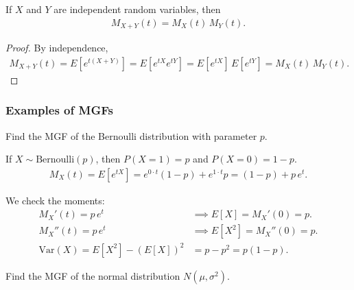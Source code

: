 \begin{teorema}
If $X$ and $Y$ are independent random variables, then
\begin{align}
 \label{eq:2.8.13}
 M_{X+Y}(t) = M_X(t)\,M_Y(t).
\end{align}
\end{teorema}

\begin{proof}
By independence,
\begin{align}
 M_{X+Y}(t) = E[e^{t(X+Y)}] = E[e^{tX}e^{tY}] = E[e^{tX}]\,E[e^{tY}] = M_X(t)\,M_Y(t).
\end{align}
\end{proof}

\subsubsection{Examples of MGFs}

\begin{ejemplo}
 \label{exmp:2.8.4}
Find the MGF of the Bernoulli distribution with parameter $p$.
\end{ejemplo}

\begin{solucion}
If $X \sim \text{Bernoulli}(p)$, then $P(X=1) = p$ and $P(X=0) = 1-p$.
\begin{align}
 M_X(t) = E[e^{tX}] = e^{0 \cdot t}(1-p) + e^{1 \cdot t}p
 = (1-p) + p\,e^t.
\end{align}

We check the moments:
\begin{align}
 M_X'(t) = p\,e^t &\implies E[X] = M_X'(0) = p. \\
 M_X''(t) = p\,e^t &\implies E[X^2] = M_X''(0) = p. \\
 \text{Var}(X) = E[X^2] - (E[X])^2 &= p - p^2 = p(1-p).
\end{align}
\end{solucion}

\begin{ejemplo}
 \label{exmp:2.8.5}
Find the MGF of the normal distribution $N(\mu, \sigma^2)$.
\end{ejemplo}

